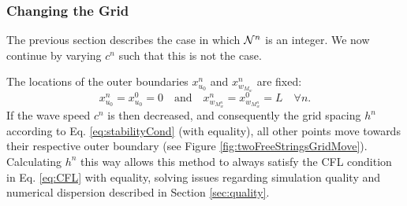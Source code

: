\subsubsection{Changing the Grid}\label{sec:changingGrid}
The previous section describes the case in which $\mathcal{N}^n$ is an integer. %
We now continue by varying $c^n$ such that this is not the case.

The locations of the outer boundaries $x_{u_0}^n$ and $x_{w_{M_w}}^n$ are fixed:
\begin{equation*}
    x_{u_0}^n = x_{u_0}^0 = 0 \quad \text{and}\quad x_{w_{M_w^n}}^n = x_{w_{M_w^n}}^0 = L \quad \forall n.
\end{equation*}
If the wave speed $c^n$ is then decreased, and consequently the grid spacing $h^n$ according to Eq. \eqref{eq:stabilityCond} (with equality), all other points move towards their respective outer boundary (see Figure \ref{fig:twoFreeStringsGridMove}). Calculating $h^n$ this way allows this method to always satisfy the CFL condition in Eq. \eqref{eq:CFL} with equality, solving issues regarding simulation quality and numerical dispersion described in Section \ref{sec:quality}. %


